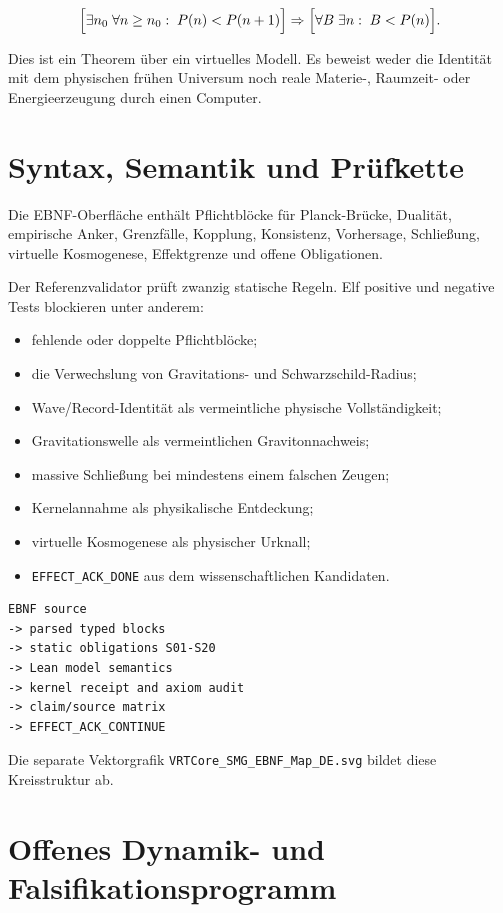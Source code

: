 \documentclass[11pt,a4paper]{article}
\newcommand{\code}[1]{\texttt{#1}}
\begin{document}
\[
\Bigl[\exists n_0\;\forall n\ge n_0:\;P(n)<P(n+1)\Bigr]
\Rightarrow
\Bigl[\forall B\;\exists n:\;B<P(n)\Bigr].
\]

Dies ist ein Theorem über ein virtuelles Modell. Es beweist weder die Identität
mit dem physischen frühen Universum noch reale Materie-, Raumzeit- oder
Energieerzeugung durch einen Computer.

\section{Syntax, Semantik und Prüfkette}

Die EBNF-Oberfläche enthält Pflichtblöcke für Planck-Brücke, Dualität,
empirische Anker, Grenzfälle, Kopplung, Konsistenz, Vorhersage, Schließung,
virtuelle Kosmogenese, Effektgrenze und offene Obligationen.

Der Referenzvalidator prüft zwanzig statische Regeln. Elf positive und negative
Tests blockieren unter anderem:

\begin{itemize}
  \item fehlende oder doppelte Pflichtblöcke;
  \item die Verwechslung von Gravitations- und Schwarzschild-Radius;
  \item Wave/Record-Identität als vermeintliche physische Vollständigkeit;
  \item Gravitationswelle als vermeintlichen Gravitonnachweis;
  \item massive Schließung bei mindestens einem falschen Zeugen;
  \item Kernelannahme als physikalische Entdeckung;
  \item virtuelle Kosmogenese als physischer Urknall;
  \item \code{EFFECT\_ACK\_DONE} aus dem wissenschaftlichen Kandidaten.
\end{itemize}

\begin{lstlisting}
EBNF source
-> parsed typed blocks
-> static obligations S01-S20
-> Lean model semantics
-> kernel receipt and axiom audit
-> claim/source matrix
-> EFFECT_ACK_CONTINUE
\end{lstlisting}

Die separate Vektorgrafik
\code{VRTCore\_SMG\_EBNF\_Map\_DE.svg} bildet diese Kreisstruktur ab.

\section{Offenes Dynamik- und Falsifikationsprogramm}
\end{document}
